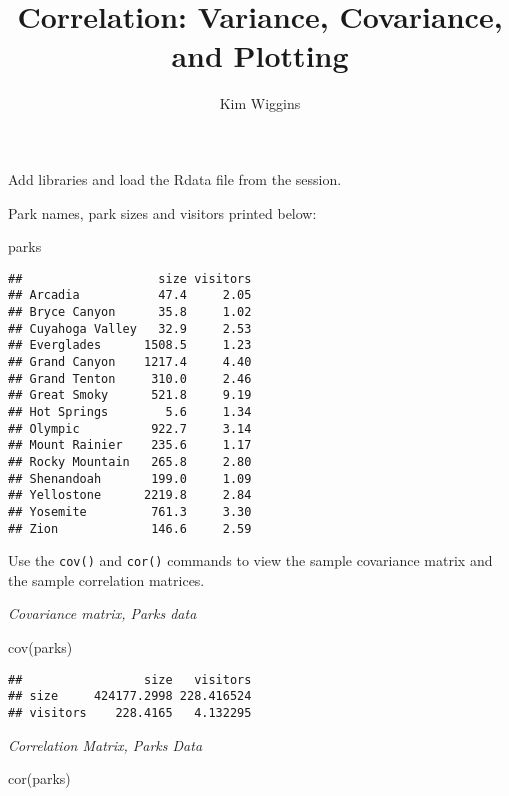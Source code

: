 \documentclass[
]{article}
\title{Correlation: Variance, Covariance, and Plotting}
\author{Kim Wiggins}
\date{}
\newenvironment{Shaded}{\begin{snugshade}}{\end{snugshade}}
\newcommand{\FunctionTok}[1]{\textcolor[rgb]{0.00,0.00,0.00}{#1}}
\newcommand{\NormalTok}[1]{#1}
\begin{document}
\maketitle

Add libraries and load the Rdata file from the session.

Park names, park sizes and visitors printed below:

\begin{Shaded}
\begin{Highlighting}[]
\NormalTok{parks}
\end{Highlighting}
\end{Shaded}

\begin{verbatim}
##                   size visitors
## Arcadia           47.4     2.05
## Bryce Canyon      35.8     1.02
## Cuyahoga Valley   32.9     2.53
## Everglades      1508.5     1.23
## Grand Canyon    1217.4     4.40
## Grand Tenton     310.0     2.46
## Great Smoky      521.8     9.19
## Hot Springs        5.6     1.34
## Olympic          922.7     3.14
## Mount Rainier    235.6     1.17
## Rocky Mountain   265.8     2.80
## Shenandoah       199.0     1.09
## Yellostone      2219.8     2.84
## Yosemite         761.3     3.30
## Zion             146.6     2.59
\end{verbatim}

Use the \texttt{cov()} and \texttt{cor()} commands to view the sample
covariance matrix and the sample correlation matrices.

\emph{Covariance matrix, Parks data}

\begin{Shaded}
\begin{Highlighting}[]
\FunctionTok{cov}\NormalTok{(parks)}
\end{Highlighting}
\end{Shaded}

\begin{verbatim}
##                 size   visitors
## size     424177.2998 228.416524
## visitors    228.4165   4.132295
\end{verbatim}

\emph{Correlation Matrix, Parks Data}

\begin{Shaded}
\begin{Highlighting}[]
\FunctionTok{cor}\NormalTok{(parks)}
\end{Highlighting}
\end{Shaded}
\end{document}
